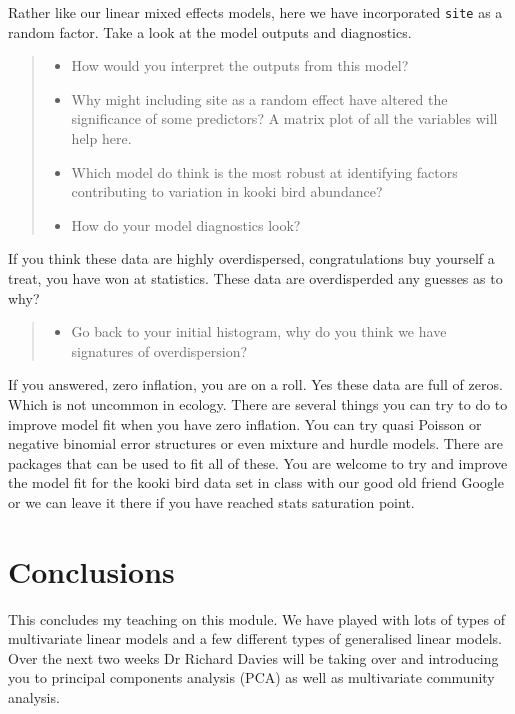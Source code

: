 \documentclass[
]{book}
\providecommand{\tightlist}{%
  \setlength{\itemsep}{0pt}\setlength{\parskip}{0pt}}
\begin{document}
Rather like our linear mixed effects models, here we have incorporated \texttt{site} as a random factor. Take a look at the model outputs and diagnostics.

\begin{quote}
\begin{itemize}
\tightlist
\item
  How would you interpret the outputs from this model?
\item
  Why might including site as a random effect have altered the significance of some predictors? A matrix plot of all the variables will help here.
\item
  Which model do think is the most robust at identifying factors contributing to variation in kooki bird abundance?
\item
  How do your model diagnostics look?
\end{itemize}
\end{quote}

If you think these data are highly overdispersed, congratulations buy yourself a treat, you have won at statistics. These data are overdisperded any guesses as to why?

\begin{quote}
\begin{itemize}
\tightlist
\item
  Go back to your initial histogram, why do you think we have signatures of overdispersion?
\end{itemize}
\end{quote}

If you answered, zero inflation, you are on a roll. Yes these data are full of zeros. Which is not uncommon in ecology. There are several things you can try to do to improve model fit when you have zero inflation. You can try quasi Poisson or negative binomial error structures or even mixture and hurdle models. There are packages that can be used to fit all of these. You are welcome to try and improve the model fit for the kooki bird data set in class with our good old friend Google or we can leave it there if you have reached stats saturation point.

\hypertarget{conclusions-2}{%
\section{Conclusions}\label{conclusions-2}}

This concludes my teaching on this module. We have played with lots of types of multivariate linear models and a few different types of generalised linear models. Over the next two weeks Dr Richard Davies will be taking over and introducing you to principal components analysis (PCA) as well as multivariate community analysis.
\end{document}
